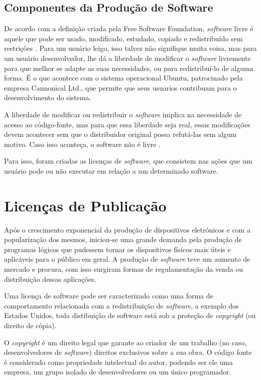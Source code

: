 \documentclass{classe_cn}                 %
\begin{document}
\subsection{Componentes da Produção de Software}

De acordo com a definição criada pela Free Software Foundation, \textit{software} livre é aquele que pode ser usado, modificado, estudado, copiado e redistribuído sem restrições \cite{FSF}. Para um usuário leigo, isso talvez não signifique muita coisa, mas para um usuário desenvolvedor, lhe dá a liberdade de modificar o \textit{software} livremente para que melhor se adapte as suas necessidades, ou para redistribuí-lo de alguma forma. É o que acontece com o sistema operacional Ubuntu, patrocinado pela empresa Cannonical Ltd., que permite que seus usuarios contribuam para o desenvolvimento do sistema.

A liberdade de modificar ou redistribuir o \textit{software} implica na necessidade de acesso ao código-fonte, mas para que essa liberdade seja real, essas modificações devem acontecer sem que o distribuidor original possa refutá-las sem algum motivo. Caso isso aconteça, o software não é livre \cite{FSF}.

Para isso, foram criadas as licenças de \textit{software}, que consistem nas ações que um usuário pode ou não executar em relação a um determinado software.

\section{Licenças de Publicação}

Após o crescimento exponencial da produção de dispositivos eletrônicos e com a popularização dos mesmos, iniciou-se uma grande demanda pela produção de programas lógicos que pudessem tornar os dispositivos físicos mais úteis e aplicáveis para o público em geral. A produção de \textit{software} teve um aumento de mercado e procura, com isso surgiram formas de regulamentação da venda ou distribuição dessas aplicações.

Uma licença de software pode ser caracterizado como uma forma de comportamento relacionada com a redistribuição de \textit{software}, a exemplo dos Estados Unidos, toda distibuição de software está sob a proteção de \textit{copyright} (ou direito de cópia).

O \textit{copyright} é um direito legal que garante ao criador de um trabalho (no caso, desenvolvedores de \textit{software}) direitos exclusivos sobre a sua obra. O código fonte é considerado como propriedade intelectual do autor, podendo ser ele uma empresa, um grupo isolado de desenvolvedores ou um único programador.
\end{document}
